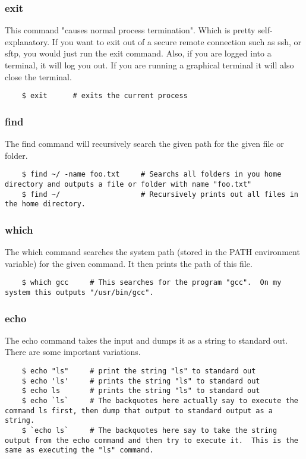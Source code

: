 \subsubsection{exit} \mdseries
This command "causes normal process termination".  Which is pretty self-explanatory.  If you want to exit out of a secure remote connection such as ssh, or sftp, you would just run the exit command.  Also, if you are logged into a terminal, it will log you out.  If you are running a graphical terminal it will also close the terminal.

	\begin{lstlisting}
	$ exit		# exits the current process
	\end{lstlisting}


\subsubsection{find} \mdseries
The find command will recursively search the given path for the given file or folder.

	\begin{lstlisting}
	$ find ~/ -name foo.txt		# Searchs all folders in you home directory and outputs a file or folder with name "foo.txt"
	$ find ~/					# Recursively prints out all files in the home directory.
	\end{lstlisting}


\subsubsection{which} \mdseries
The which command searches the system path (stored in the PATH environment variable) for the given command.  It then prints the path of this file.

	\begin{lstlisting}
	$ which gcc		# This searches for the program "gcc".  On my system this outputs "/usr/bin/gcc".  
	\end{lstlisting}

\subsubsection{echo} \mdseries
The echo command takes the input and dumps it as a string to standard out.  There are some important variations.

	\begin{lstlisting}
	$ echo "ls"		# print the string "ls" to standard out
	$ echo 'ls'		# prints the string "ls" to standard out
	$ echo ls		# prints the string "ls" to standard out
	$ echo `ls`		# The backquotes here actually say to execute the command ls first, then dump that output to standard output as a string.
	$ `echo ls`		# The backquotes here say to take the string output from the echo command and then try to execute it.  This is the same as executing the "ls" command.
	\end{lstlisting}

